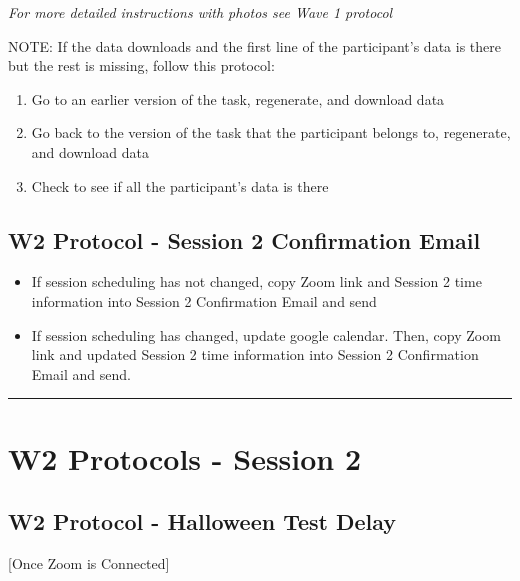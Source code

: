 \documentclass[
]{book}
\begin{document}
\emph{For more detailed instructions with photos see Wave 1 protocol}

NOTE: If the data downloads and the first line of the participant's data is there but the rest is missing, follow this protocol:

\begin{enumerate}
\def\labelenumi{\arabic{enumi}.}
\item
  Go to an earlier version of the task, regenerate, and download data
\item
  Go back to the version of the task that the participant belongs to, regenerate, and download data
\item
  Check to see if all the participant's data is there
\end{enumerate}

\hypertarget{w2-protocol---session-2-confirmation-email}{%
\subsection{W2 Protocol - Session 2 Confirmation Email}\label{w2-protocol---session-2-confirmation-email}}

\begin{itemize}
\item
  If session scheduling has not changed, copy Zoom link and Session 2 time information into Session 2 Confirmation Email and send
\item
  If session scheduling has changed, update google calendar. Then, copy Zoom link and updated Session 2 time information into Session 2 Confirmation Email and send.
\end{itemize}

\begin{center}\rule{0.5\linewidth}{0.5pt}\end{center}

\hypertarget{w2-protocols---session-2}{%
\section{W2 Protocols - Session 2}\label{w2-protocols---session-2}}

\hypertarget{w2-protocol---halloween-test-delay}{%
\subsection{W2 Protocol - Halloween Test Delay}\label{w2-protocol---halloween-test-delay}}

{[}Once Zoom is Connected{]}
\end{document}
